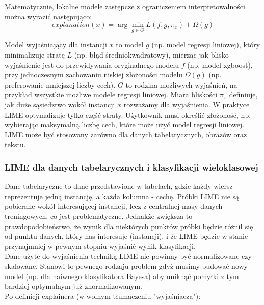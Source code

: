 Matematycznie, lokalne modele zastępcze z ograniczeniem interpretowalności można wyrazić następująco:\\

\begin{equation}
    {explanation}(x) = \arg\min_{g \in G} L(f, g, \pi_x) + \Omega(g)
\end{equation}

Model wyjaśniający dla instancji \( x \) to model \( g \) (np. model regresji liniowej), który minimalizuje stratę \( L \) (np. błąd średniokwadratowy), mierząc jak blisko wyjaśnienie jest do przewidywania oryginalnego modelu \( f \) (np. model xgboost), przy jednoczesnym zachowaniu niskiej złożoności modelu \( \Omega(g) \) (np. preferowanie mniejszej liczby cech). \( G \) to rodzina możliwych wyjaśnień, na przykład wszystkie możliwe modele regresji liniowej. Miara bliskości \( \pi_x \) definiuje, jak duże sąsiedztwo wokół instancji \( x \) rozważamy dla wyjaśnienia. W praktyce LIME optymalizuje tylko część straty. Użytkownik musi określić złożoność, np. wybierając maksymalną liczbę cech, które może użyć model regresji liniowej.\\

LIME może być stosowany zarówno dla danych tabelarycznych, obrazów oraz tekstu.\\

\subsubsection{LIME dla danych tabelarycznych i klasyfikacji wieloklasowej}

Dane tabelaryczne to dane przedstawione w tabelach, gdzie każdy wiersz reprezentuje jedną instancję, a każda kolumna - cechę. Próbki LIME nie są pobierane wokół interesującej instancji, lecz z centralnej masy danych treningowych, co jest problematyczne. Jednakże zwiększa to prawdopodobieństwo, że wynik dla niektórych punktów próbki będzie różnił się od punktu danych, który nas interesuje (instancji), i że LIME będzie w stanie przynajmniej w pewnym stopniu wyjaśnić wynik klasyfikacji.\\

Dane użyte do wyjaśnienia techniką LIME nie powinny być normalizowane czy skalowane. Stanowi to pewnego rodzaju problem gdyż musimy budować nowy model (np. dla naiwnego klasyfikatora Bayesa) aby uniknąć pomyłki z tym bardziej optymalnym już znormalizowanym.\\

Po definicji explainera (w wolnym tłumaczeniu "wyjaśniacza"):

